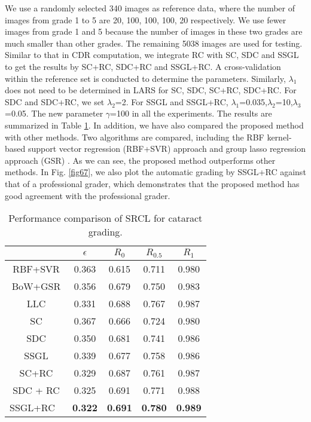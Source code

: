 \documentclass[journal]{IEEEtran}
\begin{document}
We use a randomly selected 340 images  as reference data,  where the number of images from grade 1 to 5 are 20, 100, 100, 100, 20 respectively. We use fewer images from grade 1 and 5 because the number of images in these two grades are much smaller than other grades. 
  The remaining 5038 images are used for testing. Similar to that in CDR computation, we integrate RC with SC, SDC and SSGL to get the results by SC+RC, SDC+RC and SSGL+RC. A cross-validation within the reference set is conducted to determine the parameters. 
  Similarly, $\lambda_1$ does not need to be determined in LARS for
  SC, SDC, SC+RC, SDC+RC. For SDC and SDC+RC, we set $\lambda_2$=2. For SSGL and SSGL+RC, 
  $\lambda_1$=0.035,$\lambda_2$=10,$\lambda_3$=0.05. The new parameter $\gamma$=100 in all the experiments.  
    The results are summarized in Table \ref{table3}. In addition, we have also compared the proposed method  with other methods. Two algorithms are compared, including the RBF  kernel-based support vector regression (RBF+SVR) approach \cite{5415679}   and    group lasso regression approach (GSR) \cite{Xu13}.   As we can see, the proposed method outperforms  other methods.
 In Fig. \ref{fig67}, we also plot the automatic grading by SSGL+RC against that of a professional grader,  which demonstrates that the proposed method has good agreement with the professional grader. 
\begin{table}
	\caption{ Performance comparison of SRCL for cataract grading.
	} \begin{center}
		\begin{tabular}{c|c|c  |c|c } \hline
			& {$\epsilon$}  &   $R_0$ & $R_{0.5}$ & $R_1$
			\\\hline
			RBF+SVR \cite{5415679}  & 0.363 & 0.615 & 0.711 & 0.980 \\ \hline
			BoW+GSR \cite{Xu13} & 0.356 & 0.679 & 0.750   & 0.983 \\ \hline
	    	LLC \cite{yanwu2016} & 0.331 & 0.688 & 0.767 & 0.987 \\ \hline
			SC \cite{sparsecoding}   & 0.367& 0.666 & 0.724 & 0.980       \\\hline
			
			SDC \cite{CJ15}  & 0.350  &    0.681 & 0.741 & 0.986         \\\hline
				SSGL \cite{Cheng:17BOE}    & 0.339  &    0.677 & 0.758 & 0.986         \\\hline
			SC+RC & 0.329 & 0.687 & 0.761 & 0.987    \\\hline
			SDC + RC  & {0.325}   &   {0.691} &  {0.771} &  {0.988}       \\\hline
				SSGL+RC \  &  \textbf{0.322}  &     \textbf{0.691} &  \textbf{0.780} &  \textbf{0.989}        \\\hline
			
		\end{tabular}
	\end{center}
	\label{table3}
\end{table}
\end{document}
